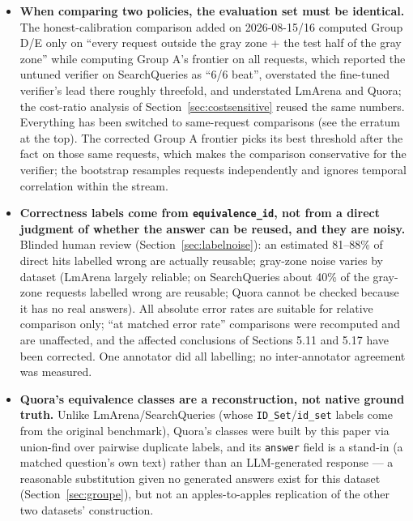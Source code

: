 \documentclass[11pt]{article}
\begin{document}
\begin{itemize}[leftmargin=*]
  \item \textbf{When comparing two policies, the evaluation set must be identical.} The honest-calibration comparison added on 2026-08-15/16 computed Group D/E only on ``every request outside the gray zone + the test half of the gray zone'' while computing Group A's frontier on all requests, which reported the untuned verifier on SearchQueries as ``6/6 beat'', overstated the fine-tuned verifier's lead there roughly threefold, and understated LmArena and Quora; the cost-ratio analysis of Section~\ref{sec:costsensitive} reused the same numbers. Everything has been switched to same-request comparisons (see the erratum at the top). The corrected Group A frontier picks its best threshold after the fact on those same requests, which makes the comparison conservative for the verifier; the bootstrap resamples requests independently and ignores temporal correlation within the stream.
  \item \textbf{Correctness labels come from \texttt{equivalence\_\allowbreak{}id}, not from a direct judgment of whether the answer can be reused, and they are noisy.} Blinded human review (Section~\ref{sec:labelnoise}): an estimated 81–88\% of direct hits labelled wrong are actually reusable; gray-zone noise varies by dataset (LmArena largely reliable; on SearchQueries about 40\% of the gray-zone requests labelled wrong are reusable; Quora cannot be checked because it has no real answers). All absolute error rates are suitable for relative comparison only; ``at matched error rate'' comparisons were recomputed and are unaffected, and the affected conclusions of Sections 5.11 and 5.17 have been corrected. One annotator did all labelling; no inter-annotator agreement was measured.
  \item \textbf{Quora's equivalence classes are a reconstruction, not native ground truth.} Unlike LmArena/SearchQueries (whose \texttt{ID\_\allowbreak{}Set}/\texttt{id\_\allowbreak{}set} labels come from the original benchmark), Quora's classes were built by this paper via union-find over pairwise duplicate labels, and its \texttt{answer} field is a stand-in (a matched question's own text) rather than an LLM-generated response --- a reasonable substitution given no generated answers exist for this dataset (Section~\ref{sec:groupe}), but not an apples-to-apples replication of the other two datasets' construction.

\end{itemize}
\end{document}
